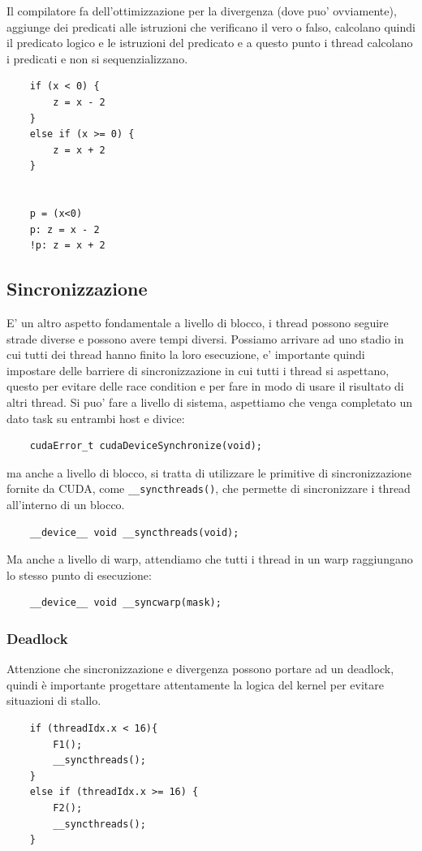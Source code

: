 Il compilatore fa dell'ottimizzazione per la divergenza (dove puo' ovviamente), aggiunge dei predicati alle istruzioni che verificano il vero o falso, calcolano quindi il predicato logico e le istruzioni del predicato e a questo punto i thread calcolano i predicati e non si sequenzializzano.

\begin{lstlisting}
    if (x < 0) {
        z = x - 2
    }
    else if (x >= 0) {
        z = x + 2
    }


    p = (x<0)
    p: z = x - 2
    !p: z = x + 2
\end{lstlisting}

\subsection{Sincronizzazione}
E' un altro aspetto fondamentale a livello di blocco, i thread possono seguire strade diverse e possono avere tempi diversi. Possiamo arrivare ad uno stadio in cui tutti dei thread hanno finito la loro esecuzione, e' importante quindi impostare delle barriere di sincronizzazione in cui tutti i thread si aspettano, questo per evitare delle race condition e per fare in modo di usare il risultato di altri thread.
Si puo' fare a livello di sistema, aspettiamo che venga completato un dato task su entrambi host e divice:
\begin{lstlisting}
    cudaError_t cudaDeviceSynchronize(void);
\end{lstlisting}

ma anche a livello di blocco, si tratta di utilizzare le primitive di sincronizzazione fornite da CUDA, come \texttt{\_\_syncthreads()}, che permette di sincronizzare i thread all'interno di un blocco.
\begin{lstlisting}
    __device__ void __syncthreads(void);
\end{lstlisting}

Ma anche a livello di warp, attendiamo che tutti i thread in un warp raggiungano lo stesso punto di esecuzione:
\begin{lstlisting}
    __device__ void __syncwarp(mask);
\end{lstlisting}

\subsubsection{Deadlock}
Attenzione che sincronizzazione e divergenza possono portare ad un deadlock, quindi è importante progettare attentamente la logica del kernel per evitare situazioni di stallo.
\begin{lstlisting}
    if (threadIdx.x < 16){
        F1();
        __syncthreads();
    }
    else if (threadIdx.x >= 16) {
        F2();
        __syncthreads();
    }
\end{lstlisting}

